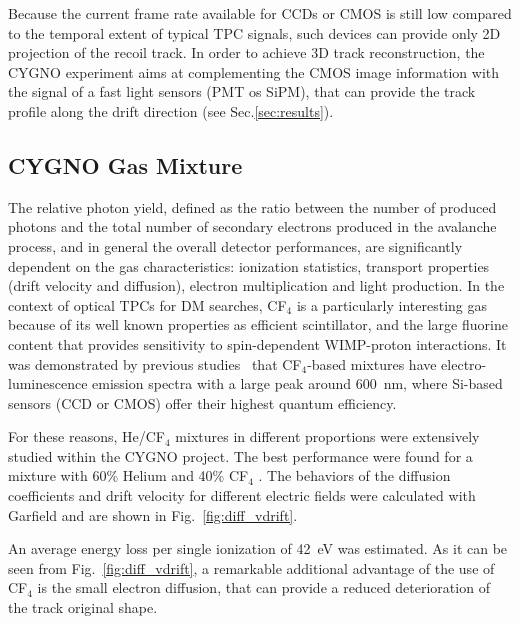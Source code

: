 \documentclass[physics,article,submit,moreauthors,pdftex]{Definitions/mdpi}
\begin{document}
Because the current frame rate available for CCDs or CMOS is still low compared to the temporal extent of typical TPC signals, such devices can provide only 2D projection of the recoil track. In order to achieve 3D track reconstruction, the CYGNO experiment aims at complementing the CMOS image information with the signal of a fast light sensors (PMT os SiPM), that can provide the track profile along the drift direction (see Sec.\ref{sec:results}).


\subsection{CYGNO Gas Mixture}\label{sec:gas}

The relative photon yield, defined as the ratio between the number of produced photons and the total number of secondary electrons produced in the avalanche process, and in general the overall detector performances, are significantly dependent on the gas characteristics: ionization statistics, transport properties (drift velocity and diffusion), electron multiplication and light production. In the context of optical TPCs for DM searches, CF$_4$ is a particularly interesting gas because of its well known properties as efficient scintillator, and the large fluorine content that provides sensitivity to spin-dependent WIMP-proton interactions. It was demonstrated by previous studies~\cite{bib:Fraga} that CF$_4$-based mixtures have electro-luminescence emission spectra with a large peak around 600~nm, where Si-based sensors (CCD or CMOS) offer their highest quantum efficiency.

For these reasons, He/CF$_{4}$ mixtures in different proportions were extensively studied within the CYGNO project. The best performance were found for a mixture with 60\% Helium and 40\% CF$_{4}$ \cite{bib:fe55New, bib:roby}. The behaviors of the diffusion coefficients and drift velocity for different electric fields were calculated with Garfield \cite{bib:garfield1,bib:garfield2} and are shown in Fig.~\ref{fig:diff_vdrift}. 

An average energy loss per single ionization of 42~eV was estimated. As it can be seen from Fig.~\ref{fig:diff_vdrift}, a remarkable additional advantage of the use of CF$_4$ is the small electron diffusion, that can provide a reduced deterioration of the track original shape.
\end{document}
